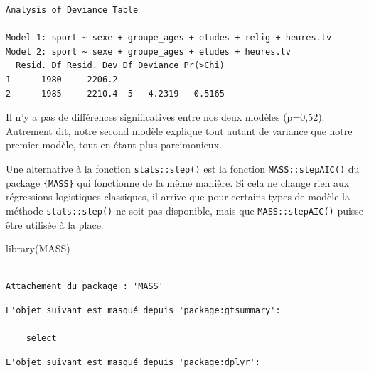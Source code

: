\documentclass[
  letterpaper,
  DIV=11,
  numbers=noendperiod,
  oneside]{scrreprt}
\newenvironment{Shaded}{\begin{snugshade}}{\end{snugshade}}
\newcommand{\FunctionTok}[1]{\textcolor[rgb]{0.28,0.35,0.67}{#1}}
\newcommand{\NormalTok}[1]{\textcolor[rgb]{0.00,0.23,0.31}{#1}}
\begin{document}
\begin{verbatim}
Analysis of Deviance Table

Model 1: sport ~ sexe + groupe_ages + etudes + relig + heures.tv
Model 2: sport ~ sexe + groupe_ages + etudes + heures.tv
  Resid. Df Resid. Dev Df Deviance Pr(>Chi)
1      1980     2206.2                     
2      1985     2210.4 -5  -4.2319   0.5165
\end{verbatim}

Il n'y a pas de différences significatives entre nos deux modèles
(p=0,52). Autrement dit, notre second modèle explique tout autant de
variance que notre premier modèle, tout en étant plus parcimonieux.

\begin{tcolorbox}[enhanced jigsaw, colbacktitle=quarto-callout-tip-color!10!white, opacityback=0, toprule=.15mm, colback=white, coltitle=black, bottomtitle=1mm, toptitle=1mm, titlerule=0mm, rightrule=.15mm, title=\textcolor{quarto-callout-tip-color}{\faLightbulb}\hspace{0.5em}{Astuce}, breakable, bottomrule=.15mm, opacitybacktitle=0.6, arc=.35mm, left=2mm, leftrule=.75mm, colframe=quarto-callout-tip-color-frame]

Une alternative à la fonction \texttt{stats::step()} est la fonction
\texttt{MASS::stepAIC()} du package \texttt{\{MASS\}} qui fonctionne de
la même manière. Si cela ne change rien aux régressions logistiques
classiques, il arrive que pour certains types de modèle la méthode
\texttt{stats::step()} ne soit pas disponible, mais que
\texttt{MASS::stepAIC()} puisse être utilisée à la place.

\begin{Shaded}
\begin{Highlighting}[]
\FunctionTok{library}\NormalTok{(MASS)}
\end{Highlighting}
\end{Shaded}

\begin{verbatim}

Attachement du package : 'MASS'
\end{verbatim}

\begin{verbatim}
L'objet suivant est masqué depuis 'package:gtsummary':

    select
\end{verbatim}

\begin{verbatim}
L'objet suivant est masqué depuis 'package:dplyr':


\end{verbatim}
\end{tcolorbox}
\end{document}
